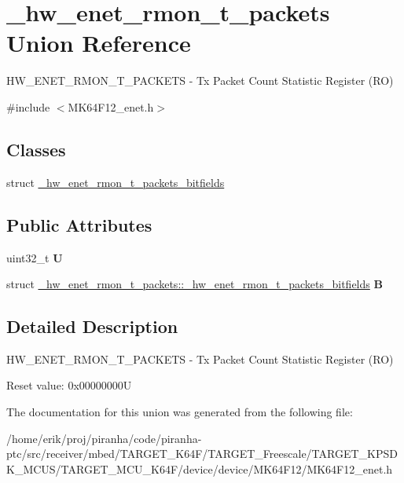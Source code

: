 \hypertarget{union__hw__enet__rmon__t__packets}{}\section{\+\_\+hw\+\_\+enet\+\_\+rmon\+\_\+t\+\_\+packets Union Reference}
\label{union__hw__enet__rmon__t__packets}


H\+W\+\_\+\+E\+N\+E\+T\+\_\+\+R\+M\+O\+N\+\_\+\+T\+\_\+\+P\+A\+C\+K\+E\+TS -\/ Tx Packet Count Statistic Register (RO)  




{\ttfamily \#include $<$M\+K64\+F12\+\_\+enet.\+h$>$}

\subsection*{Classes}
\begin{DoxyCompactItemize}
\item 
struct \hyperlink{struct__hw__enet__rmon__t__packets_1_1__hw__enet__rmon__t__packets__bitfields}{\+\_\+hw\+\_\+enet\+\_\+rmon\+\_\+t\+\_\+packets\+\_\+bitfields}
\end{DoxyCompactItemize}
\subsection*{Public Attributes}
\begin{DoxyCompactItemize}
\item 
uint32\+\_\+t {\bfseries U}\hypertarget{union__hw__enet__rmon__t__packets_ac19303f0df79229f94c551ad223e211f}{}\label{union__hw__enet__rmon__t__packets_ac19303f0df79229f94c551ad223e211f}

\item 
struct \hyperlink{struct__hw__enet__rmon__t__packets_1_1__hw__enet__rmon__t__packets__bitfields}{\+\_\+hw\+\_\+enet\+\_\+rmon\+\_\+t\+\_\+packets\+::\+\_\+hw\+\_\+enet\+\_\+rmon\+\_\+t\+\_\+packets\+\_\+bitfields} {\bfseries B}\hypertarget{union__hw__enet__rmon__t__packets_af1d38c2ddcbe5210cc5c68d953e7c93a}{}\label{union__hw__enet__rmon__t__packets_af1d38c2ddcbe5210cc5c68d953e7c93a}

\end{DoxyCompactItemize}


\subsection{Detailed Description}
H\+W\+\_\+\+E\+N\+E\+T\+\_\+\+R\+M\+O\+N\+\_\+\+T\+\_\+\+P\+A\+C\+K\+E\+TS -\/ Tx Packet Count Statistic Register (RO) 

Reset value\+: 0x00000000U 

The documentation for this union was generated from the following file\+:\begin{DoxyCompactItemize}
\item 
/home/erik/proj/piranha/code/piranha-\/ptc/src/receiver/mbed/\+T\+A\+R\+G\+E\+T\+\_\+\+K64\+F/\+T\+A\+R\+G\+E\+T\+\_\+\+Freescale/\+T\+A\+R\+G\+E\+T\+\_\+\+K\+P\+S\+D\+K\+\_\+\+M\+C\+U\+S/\+T\+A\+R\+G\+E\+T\+\_\+\+M\+C\+U\+\_\+\+K64\+F/device/device/\+M\+K64\+F12/M\+K64\+F12\+\_\+enet.\+h\end{DoxyCompactItemize}
